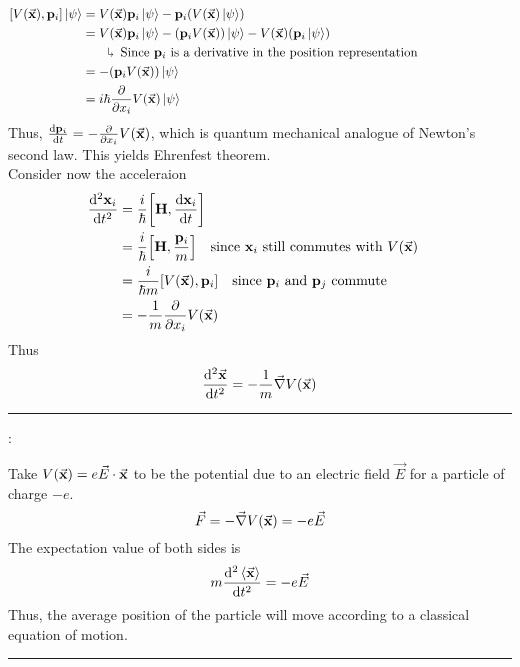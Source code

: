 \documentclass[12pt,a4paper,titlepage]{article}
\newcommand{\ul}[1]{\underline{\smash{#1}}} %
\newcommand{\explain}[1]{%
	\quad\rotatebox[origin=c]{180}{\enskip$\Lsh$}\hfill
	\begin{minipage}[t]{\dimexpr\linewidth-8em\relax}
	#1
	\end{minipage}\hspace{4em}\bigskip
}
\newcommand{\example}[2]{%
	\bigskip
	\hrule
	\bigskip
	\ul{Ex #1}:\hfill
	\begin{minipage}[t]{\dimexpr\linewidth-8em\relax}
	#2
	\end{minipage}\hspace{4em}
	\bigskip
	\hrule
	\bigskip
}
\begin{document}
\begin{equation}
\begin{aligned}
\comm{V(\vec{\vb{x}})}{\vb{p}_{i}}\ket{\psi}&=V(\vec{\vb{x}})\vb{p}_{i}\ket{\psi}-\vb{p}_{i}\qty(V(\vec{\vb{x}})\ket{\psi})\\
&=V(\vec{\vb{x}})\vb{p}_{i}\ket{\psi}-\qty(\vb{p}_{i}V(\vec{\vb{x}}))\ket{\psi}-V(\vec{\vb{x}})\qty(\vb{p}_{i}\ket{\psi})\\
&\quad\explain{Since $\vb{p}_{i}$ is a derivative in the position representation}\\
&=-\qty(\vb{p}_{i}V(\vec{\vb{x}}))\ket{\psi}\\
&=i\hbar\pdv{x_{i}}V(\vec{\vb{x}})\ket{\psi}
\end{aligned}
\end{equation}
Thus, $\dv{\vb{p}_{i}}{t}=-\pdv{x_{i}}V(\vec{\vb{x}})$, which is quantum mechanical analogue of Newton's second law. This yields Ehrenfest theorem.\\

Consider now the acceleraion
\begin{equation}
\begin{aligned}
\dv[2]{\vb{x}_{i}}{t}&=\frac{i}{\hbar}\comm{\vb{H}}{\dv{\vb{x}_{i}}{t}}\\
&=\frac{i}{\hbar}\comm{\vb{H}}{\frac{\vb{p}_{i}}{m}}\qq{since $\vb{x}_{i}$ still commutes with $V(\vec{\vb{x}})$}\\
&=\frac{i}{\hbar m}\comm{V(\vec{\vb{x}})}{\vb{p}_{i}}\qq{since $\vb{p}_{i}$ and $\vb{p}_{j}$ commute}\\
&=-\frac{1}{m}\pdv{x_{i}}V(\vec{\vb{x}})
\end{aligned}
\end{equation}
Thus
\begin{equation}
\dv[2]{\vec{\vb{x}}}{t}=-\frac{1}{m}\vec{\nabla}V(\vec{\vb{x}})
\end{equation}

\example{1}{Take $V(\vec{\vb{x}})=e\vec{E}\cdot\vec{\vb{x}}$ to be the potential due to an electric field $\vec{E}$ for a particle of charge $-e$.
\begin{equation}
\vec{F}=-\vec{\nabla}V(\vec{\vb{x}})=-e\vec{E}
\end{equation}
The expectation value of both sides is
\begin{equation}
m\dv[2]{\expval{\vec{\vb{x}}}}{t}=-e\vec{E}
\end{equation}
Thus, the average position of the particle will move according to a classical equation of motion.
}
\end{document}
